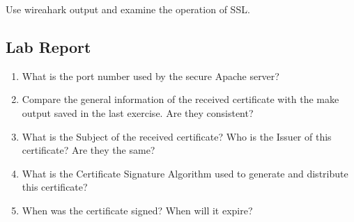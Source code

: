 \documentclass[10pt,a4paper]{article}
\numberwithin{equation}{section}
\numberwithin{figure}{section}
\numberwithin{table}{section}
\begin{document}
Use wireahark output and examine the operation of SSL.

\subsection*{Lab Report}
\begin{enumerate}
	\setlength{\itemindent}{0pt}
	\item What is the port number used by the secure Apache server?
	\item Compare the general information of the received certificate with the make output saved in the last exercise. Are they consistent?
	\item What is the Subject of the received certificate? Who is the Issuer of this certificate? Are they the same?
	\item What is the Certificate Signature Algorithm used to generate and distribute this certificate?
	\item When was the certificate signed? When will it expire?
\end{enumerate}
\end{document}

